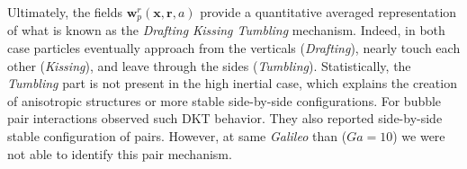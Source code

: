 Ultimately, the fields $\textbf{w}^r_p(\textbf{x},\textbf{r}, a)$ provide a quantitative averaged representation of what is known as the \textit{Drafting Kissing Tumbling} \citep{fortes1987nonlinear} mechanism. 
Indeed, in both case particles eventually approach from the verticals (\textit{Drafting}), nearly touch each other (\textit{Kissing}), and leave through the sides (\textit{Tumbling}). 
Statistically, the \textit{Tumbling} part is not present in the high inertial case, which  explains the creation of anisotropic structures or more stable side-by-side configurations. 
For bubble pair interactions \citet{zhang2021three} observed such DKT behavior.
They also reported side-by-side stable configuration of pairs. 
However, at same \textit{Galileo} than  \citet{zhang2021three} ($Ga = 10$) we were not able to identify this pair mechanism. 


